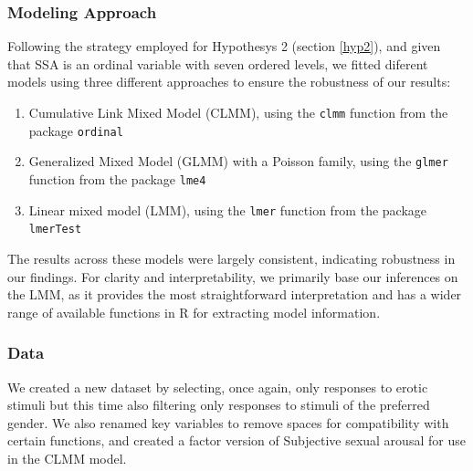 \documentclass[
  bookmarksnumbered]{article}
\providecommand{\tightlist}{%
  \setlength{\itemsep}{0pt}\setlength{\parskip}{0pt}}
\begin{document}
\subsubsection{Modeling Approach}\label{modeling-approach-1}

Following the strategy employed for Hypothesys 2 (section \ref{hyp2}), and given that SSA is an ordinal variable with seven ordered levels, we fitted diferent models using three different approaches to ensure the robustness of our results:

\begin{enumerate}
\def\labelenumi{\arabic{enumi}.}
\tightlist
\item
  Cumulative Link Mixed Model (CLMM), using the \texttt{clmm} function from the package \texttt{ordinal} \autocite{ordinalcit}
\item
  Generalized Mixed Model (GLMM) with a Poisson family, using the \texttt{glmer} function from the package \texttt{lme4} \autocite{lme4cit}
\item
  Linear mixed model (LMM), using the \texttt{lmer} function from the package \texttt{lmerTest} \autocite{lmertestcit}
\end{enumerate}

The results across these models were largely consistent, indicating robustness in our findings. For clarity and interpretability, we primarily base our inferences on the LMM, as it provides the most straightforward interpretation and has a wider range of available functions in R for extracting model information.

\subsubsection{Data}\label{data-2}

We created a new dataset by selecting, once again, only responses to erotic stimuli but this time also filtering only responses to stimuli of the preferred gender. We also renamed key variables to remove spaces for compatibility with certain functions, and created a factor version of Subjective sexual arousal for use in the CLMM model.
\end{document}
